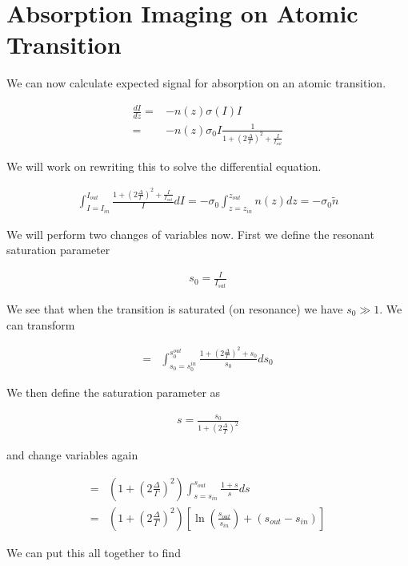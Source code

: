 \documentclass[12pt]{article}
\begin{document}
\section{Absorption Imaging on Atomic Transition}

We can now calculate expected signal for absorption on an atomic transition.

\begin{align}
\frac{dI}{dz} =& -n(z)\sigma(I) I\\
=& -n(z)\sigma_0 I \frac{1}{1+\left(2\frac{\Delta}{\Gamma}\right)^2 + \frac{I}{I_{sat}}}
\end{align}

We will work on rewriting this to solve the differential equation.

\begin{align}
\int_{I=I_{in}}^{I_{out}} \frac{1+\left(2\frac{\Delta}{\Gamma}\right)^2 + \frac{I}{I_{sat}}}{I} dI = -\sigma_0 \int_{z=z_{in}}^{z_{out}} n(z) dz = -\sigma_0 \tilde{n}
\end{align}

We will perform two changes of variables now. 
First we define the resonant saturation parameter 

\begin{align}
s_0 = \frac{I}{I_{sat}}
\end{align}

We see that when the transition is saturated (on resonance) we have $s_0 \gg 1$.
We can transform

\begin{align}
=& \int_{s_0 = s_0^{in}}^{s_0^{out}} \frac{1+\left(2\frac{\Delta}{\Gamma}\right)^2 + s_0}{s_0} ds_0
\end{align}

We then define the saturation parameter as

\begin{align}
s = \frac{s_0}{1+\left(2\frac{\Delta}{\Gamma}\right)^2}
\end{align}

and change variables again

\begin{align}
=& \left(1+\left(2\frac{\Delta}{\Gamma}\right)^2\right) \int_{s=s_{in}}^{s_{out}} \frac{1 + s}{s} ds\\
=& \left(1+\left(2\frac{\Delta}{\Gamma}\right)^2\right)\left[\ln\left(\frac{s_{out}}{s_{in}}\right) + \left(s_{out} - s_{in}\right) \right]
\end{align}

We can put this all together to find
\end{document}
